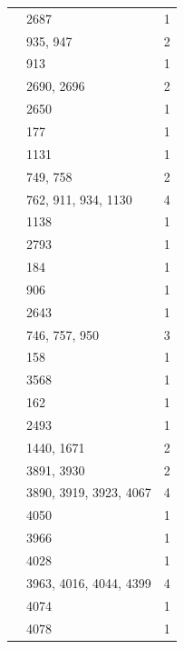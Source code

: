 \begin{longtable}{@{}p{}p{}p{}@{}}
\cite[Lemma~5.7 and the proof of Proposition~5.11]{FengYuZhang2024} & 2687 & 1 \\
\cite[Proposition~3.48]{FengYuZhang2024} & 935, 947 & 2 \\
\cite[Proposition~3.48(4)]{FengYuZhang2024} & 913 & 1 \\
\cite[Proposition~5.11]{FengYuZhang2024} & 2690, 2696 & 2 \\
\cite[Question~5.27]{FengYuZhang2024} & 2650 & 1 \\
\cite[Remark~3.36]{FengYuZhang2024} & 177 & 1 \\
\cite[Remark~3.47(2)]{FengYuZhang2024} & 1131 & 1 \\
\cite[Remark~3.49]{FengYuZhang2024} & 749, 758 & 2 \\
\cite[Remark~3.50]{FengYuZhang2024} & 762, 911, 934, 1130 & 4 \\
\cite[Section~3]{FengYuZhang2024} & 1138 & 1 \\
\cite[Theorem~1]{FengYuZhang2024} & 2793 & 1 \\
\cite[Theorem~1 and Assumption~5.1]{FengYuZhang2024} & 184 & 1 \\
\cite[Theorem~3.37]{FengYuZhang2024} & 906 & 1 \\
\cite[Theorem~5.16]{FengYuZhang2024} & 2643 & 1 \\
\cite[proof of Proposition~3.48]{FengYuZhang2024} & 746, 757, 950 & 3 \\
\cite{FongSrinivasan1989} & 158 & 1 \\
\cite{GAP2026} & 3568 & 1 \\
\cite{Geck1993} & 162 & 1 \\
\cite[Proposition~2.2]{Geck1993} & 2493 & 1 \\
\cite[Theorem~A]{Geck1993} & 1440, 1671 & 2 \\
\cite[Corollary~3.6(b)]{Geck1994BasicIII} & 3891, 3930 & 2 \\
\cite[Lemma~3.5]{Geck1994BasicIII} & 3890, 3919, 3923, 4067 & 4 \\
\cite[Lemma~3.5 and Corollary~3.6(b)]{Geck1994BasicIII} & 4050 & 1 \\
\cite{Geck1999GGGR} & 3966 & 1 \\
\cite[(2.3)(a)]{Geck1999GGGR} & 4028 & 1 \\
\cite[(2.4)]{Geck1999GGGR} & 3963, 4016, 4044, 4399 & 4 \\
\cite[(2.4)(a)]{Geck1999GGGR} & 4074 & 1 \\
\cite[(2.4)(b)]{Geck1999GGGR} & 4078 & 1 \\

\end{longtable}
